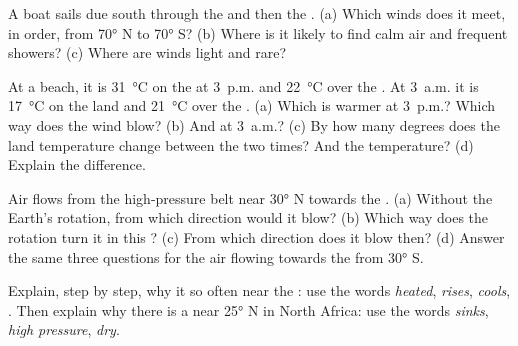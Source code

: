 \begin{exercise}[$\star\star$]\label{exo:g8:winds-global-circulation:6}
A boat sails due south through the  and then the
. (a) Which winds does it meet, in order, from
\ang{70} N to \ang{70} S? (b) Where is it likely to find calm air and
frequent showers? (c) Where are winds light and  rare?
\end{exercise}

\begin{exercise}[$\star\star$]\label{exo:g8:winds-global-circulation:7}
At a beach, it is \qty{31}{\degreeCelsius} on the  at 3~p.m. and
\qty{22}{\degreeCelsius} over the . At 3~a.m. it is
\qty{17}{\degreeCelsius} on the land and \qty{21}{\degreeCelsius} over
the . (a) Which is warmer at 3~p.m.? Which way does the wind blow?
(b) And at 3~a.m.? (c) By how many degrees does the land temperature
change between the two times? And the  temperature? (d) Explain the
difference.
\end{exercise}

\begin{exercise}[$\star\star$]\label{exo:g8:winds-global-circulation:8}
Air flows from the high-pressure belt near \ang{30} N towards the
. (a) Without the Earth's rotation, from which direction would
it blow? (b) Which way does the rotation turn it in this ?
(c) From which direction does it blow then? (d) Answer the same three
questions for the air flowing towards the  from \ang{30} S.
\end{exercise}

\begin{exercise}[$\star\star$]\label{exo:g8:winds-global-circulation:9}
Explain, step by step, why it  so often near the :
use the words \emph{heated}, \emph{rises}, \emph{cools}, \emph{}.
Then explain why there is a  near \ang{25} N in North Africa: use
the words \emph{sinks}, \emph{high pressure}, \emph{dry}.
\end{exercise}

